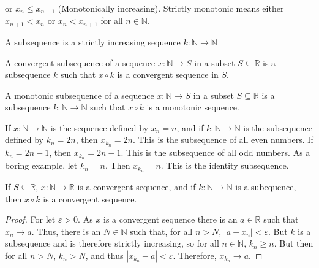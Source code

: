     or $x_{n}\leq{x_{n+1}}$ (Monotonically increasing).
    Strictly monotonic means either $x_{n+1}<x_{n}$
    or $x_{n}<x_{n+1}$ for all $n\in\mathbb{N}$.
    \begin{definition}
        A subsequence is a strictly increasing sequence
        $k:\mathbb{N}\rightarrow\mathbb{N}$
    \end{definition}
    \begin{definition}
        A convergent subsequence of a sequence
        $x:\mathbb{N}\rightarrow{S}$ in
        a subset $S\subseteq\mathbb{R}$ is a
        subsequence $k$ such that
        $x\circ{k}$ is a convergent sequence in $S$.
    \end{definition}
    \begin{definition}
        A monotonic subsequence of a sequence
        $x:\mathbb{N}\rightarrow{S}$ in a subset
        $S\subseteq\mathbb{R}$ is a subsequence
        $k:\mathbb{N}\rightarrow\mathbb{N}$ such
        that $x\circ{k}$ is a monotonic sequence.
    \end{definition}
    \begin{example}
        If $x:\mathbb{N}\rightarrow\mathbb{N}$ is
        the sequence defined by $x_{n}=n$, and if
        $k:\mathbb{N}\rightarrow\mathbb{N}$ is the
        subsequence defined by
        $k_{n}=2n$, then $x_{k_{n}}=2n$. This is the
        subsequence of all even numbers.
        If $k_{n}=2n-1$, then $x_{k_{n}}=2n-1$. This
        is the subsequence of all odd numbers. As a
        boring example, let $k_{n}=n$. Then
        $x_{k_{n}}=n$. This is the identity subsequence.
    \end{example}
    \begin{theorem}
        If $S\subseteq\mathbb{R}$,
        $x:\mathbb{N}\rightarrow\mathbb{R}$ is a
        convergent sequence, and if
        $k:\mathbb{N}\rightarrow\mathbb{N}$ is a
        subequence, then $x\circ{k}$ is a convergent
        sequence.
    \end{theorem}
    \begin{proof}
        For let $\varepsilon>0$.
        As $x$ is a convergent sequence there is
        an $a\in\mathbb{R}$ such that
        $x_{n}\rightarrow{a}$. Thus, there is an
        $N\in\mathbb{N}$ such that, for all
        $n>N$, $|a-x_{n}|<\varepsilon$. But
        $k$ is a subsequence and is therefore
        strictly increasing, so
        for all $n\in\mathbb{N}$, $k_{n}\geq{n}$.
        But then for all $n>N$, $k_{n}>N$, and thus
        $|x_{k_{n}}-a|<\varepsilon$. Therefore,
        $x_{k_{n}}\rightarrow{a}$.
    \end{proof}
